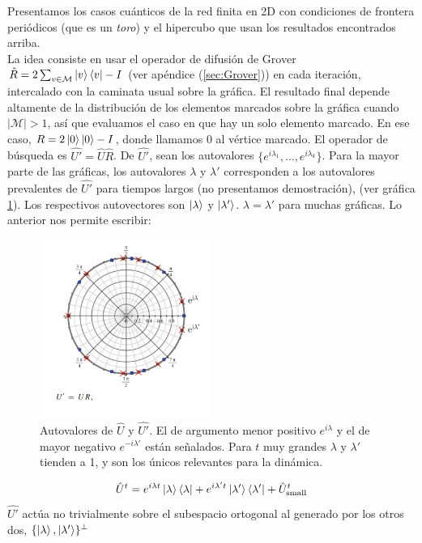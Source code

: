 Presentamos los casos cuánticos de la red finita en 2D con condiciones de frontera periódicos (que es un \textit{toro}) y el hipercubo que usan los resultados encontrados arriba.\\
La idea consiste en usar el operador de difusión de Grover $\hat{R}=2\sum_{v\in \mathcal{M}}\ket{v}\bra{v}-I$  (ver apéndice (\ref{sec:Grover})) en cada iteración, intercalado con la caminata usual sobre la gráfica. El resultado final depende altamente de la distribución de los elementos marcados sobre la gráfica cuando $|\mathcal{M}|>1$, así que evaluamos el caso en que hay un solo elemento marcado. En ese caso, $R=2\ket{0}\ket{0}-I$, donde llamamos $0$ al vértice marcado.
\noindent El operador de búsqueda es $\hat{U'}=\hat{U}\hat{R}$. De $\hat{U'}$, sean los autovalores $\{e^{i\lambda_1},\dots, e^{i\lambda_k}\}$. Para la mayor parte de las gráficas, los autovalores $\lambda$ y $\lambda'$ corresponden a los autovalores  prevalentes de $\hat{U'}$ para tiempos largos (no presentamos demostración), (ver gráfica \ref{gr:EspectroBusqueda}). Los respectivos autovectores son $\ket{\lambda}$ y $\ket{\lambda'}$. $\lambda=\lambda'$ para muchas gráficas. Lo anterior nos permite escribir:

\begin{figure}[ht]
\centering
\includegraphics[width=0.5\textwidth]{Kap5/SpatialSearchUprimePortugal.png}
\caption{Autovalores de $\hat{U}$ y $\hat{U'}$. El de argumento menor positivo $e^{i\lambda}$ y el de mayor negativo $e^{-i\lambda'}$ están señalados. Para $t$ muy grandes $\lambda$ y $\lambda'$ tienden a 1, y son los únicos relevantes para la dinámica.
\cite{portugal2013quantum}}
\label{gr:EspectroBusqueda}
\end{figure}

\begin{equation}
    \hat{U}^t=e^{i\lambda t}\ket{\lambda}\bra{\lambda}+e^{i\lambda't}\ket{ \lambda'}\bra{\lambda'}+\hat{U}_{\text{small}}^t
\end{equation}{}
$\hat{U'}$ actúa no trivialmente sobre el subespacio ortogonal al generado por los otros dos, $\{\ket{\lambda},\ket{\lambda'}\}^{\perp}$


